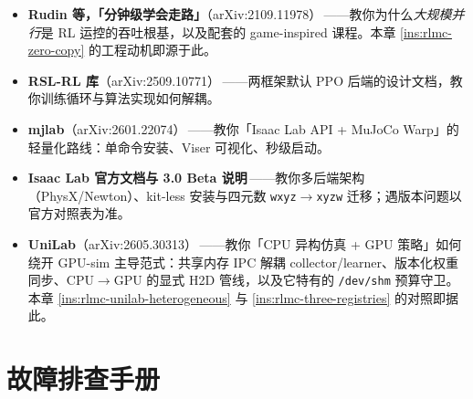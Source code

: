 \begin{itemize}
  \item \textbf{Rudin 等，「分钟级学会走路」}（arXiv:2109.11978）\,\cite{rudin2021minutes}——教你为什么\emph{大规模并行}是 RL 运控的吞吐根基，以及配套的 game-inspired 课程。本章 \cref{ins:rlmc-zero-copy} 的工程动机即源于此。
  \item \textbf{RSL-RL 库}（arXiv:2509.10771）\,\cite{schwarke2025rslrl}——两框架默认 PPO 后端的设计文档，教你训练循环与算法实现如何解耦。
  \item \textbf{mjlab}（arXiv:2601.22074）\,\cite{mjlab2026}——教你「Isaac Lab API + MuJoCo Warp」的轻量化路线：单命令安装、Viser 可视化、秒级启动。
  \item \textbf{Isaac Lab 官方文档与 3.0 Beta 说明}\,\cite{isaaclab2024}——教你多后端架构（PhysX/Newton）、kit-less 安装与四元数 \texttt{wxyz}$\to$\texttt{xyzw} 迁移；遇版本问题以官方对照表为准。
  \item \textbf{UniLab}（arXiv:2605.30313）\,\cite{unilab2026}——教你「CPU 异构仿真 + GPU 策略」如何绕开 GPU-sim 主导范式：共享内存 IPC 解耦 collector/learner、版本化权重同步、CPU$\to$GPU 的显式 H2D 管线，以及它特有的 \verb|/dev/shm| 预算守卫。本章 \cref{ins:rlmc-unilab-heterogeneous} 与 \cref{ins:rlmc-three-registries} 的对照即据此。
\end{itemize}

\section{故障排查手册}
\label{sec:rlmc-setup-troubleshoot}

